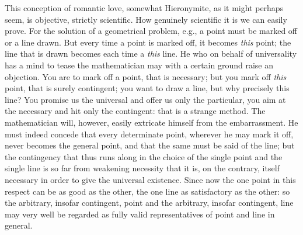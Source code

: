 \documentclass[12pt,a4paper,openany]{book}
\newcommand{\opage}[1]{\marginnote{\footnotesize\textit{[#1]}}}
\begin{document}
This conception of romantic love, somewhat Hieronymite, as it might perhaps seem, is
objective, strictly scientific. How genuinely scientific
it is we can easily prove. For the solution
of a geometrical problem, e.g., a point must be marked off
or a line drawn. But every time a point is
\setcounter{footnote}{0}%
\opage{595}marked off, it becomes \emph{this} point; the line that is drawn becomes
each time a \emph{this} line. He who on behalf of universality
has a mind to tease the mathematician
may with a certain ground raise an objection. You are to mark off
a point, that is necessary; but you mark off
\emph{this} point, that is surely contingent; you want to draw a line,
but why precisely this line? You promise us the universal
and offer us only the particular, you aim at the
necessary and hit only the contingent: that is a
strange method. The mathematician will, however, easily extricate
himself from the embarrassment. He must indeed concede that
every determinate point, wherever he may mark
it off, never becomes the general point, and that the same
must be said of the line; but the contingency that thus
runs along in the choice of the single point and the single
line is so far from weakening necessity
that it is, on the contrary, itself necessary in order to give the universal
existence. Since now the one point in this respect
can be as good as the other, the one
line as satisfactory as the other: so the
arbitrary, insofar contingent, point and the arbitrary,
insofar contingent, line may very well be regarded
as fully valid representatives of point and line in general.
\end{document}
